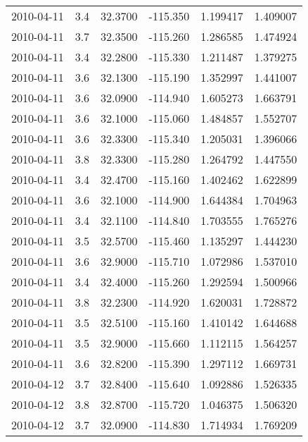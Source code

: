 \begin{tabular}{lrrrrr}
2010-04-11 &       3.4 &  32.3700 &  -115.350 &         1.199417 &         1.409007 \\
2010-04-11 &       3.7 &  32.3500 &  -115.260 &         1.286585 &         1.474924 \\
2010-04-11 &       3.4 &  32.2800 &  -115.330 &         1.211487 &         1.379275 \\
2010-04-11 &       3.6 &  32.1300 &  -115.190 &         1.352997 &         1.441007 \\
2010-04-11 &       3.6 &  32.0900 &  -114.940 &         1.605273 &         1.663791 \\
2010-04-11 &       3.6 &  32.1000 &  -115.060 &         1.484857 &         1.552707 \\
2010-04-11 &       3.6 &  32.3300 &  -115.340 &         1.205031 &         1.396066 \\
2010-04-11 &       3.8 &  32.3300 &  -115.280 &         1.264792 &         1.447550 \\
2010-04-11 &       3.4 &  32.4700 &  -115.160 &         1.402462 &         1.622899 \\
2010-04-11 &       3.6 &  32.1000 &  -114.900 &         1.644384 &         1.704963 \\
2010-04-11 &       3.4 &  32.1100 &  -114.840 &         1.703555 &         1.765276 \\
2010-04-11 &       3.5 &  32.5700 &  -115.460 &         1.135297 &         1.444230 \\
2010-04-11 &       3.6 &  32.9000 &  -115.710 &         1.072986 &         1.537010 \\
2010-04-11 &       3.4 &  32.4000 &  -115.260 &         1.292594 &         1.500966 \\
2010-04-11 &       3.8 &  32.2300 &  -114.920 &         1.620031 &         1.728872 \\
2010-04-11 &       3.5 &  32.5100 &  -115.160 &         1.410142 &         1.644688 \\
2010-04-11 &       3.5 &  32.9000 &  -115.660 &         1.112115 &         1.564257 \\
2010-04-11 &       3.6 &  32.8200 &  -115.390 &         1.297112 &         1.669731 \\
2010-04-12 &       3.7 &  32.8400 &  -115.640 &         1.092886 &         1.526335 \\
2010-04-12 &       3.8 &  32.8700 &  -115.720 &         1.046375 &         1.506320 \\
2010-04-12 &       3.7 &  32.0900 &  -114.830 &         1.714934 &         1.769209 \\

\end{tabular}
